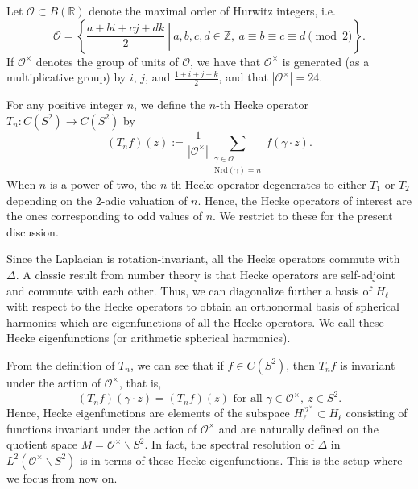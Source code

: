 \documentclass[11pt]{amsart}
\newcommand{\bigo}{\mathcal{O}}
\newcommand{\R}{\mathbb{R}}
\theoremstyle{definition}
\theoremstyle{remark}
\begin{document}
Let $\bigo\subset B(\R)$ denote the maximal order of Hurwitz integers, i.e. $$\bigo = \left\{ \left. \frac{a+bi+cj+dk}{2} \: \right| \: a,b,c,d\in \mathbb{Z}, \: a\equiv b\equiv c\equiv d \pmod{2} \right\}.$$ If $\bigo^{\times}$ denotes the group of units of $\bigo$, we have that $\bigo^{\times}$ is generated (as a multiplicative group) by $i$, $j$, and $\frac{1+i+j+k}{2}$, and that $|\bigo^{\times}| = 24$. 

For any positive integer $n$, we define the $n$-th Hecke operator $T_n : C(S^2) \rightarrow C(S^2)$ by $$ (T_n f)(z) := \frac{1}{|\bigo^{\times}|}\sum_{\substack{\gamma \in \bigo \\ \mathrm{Nrd}(\gamma) = n}} f(\gamma \cdot z).$$ When $n$ is a power of two, the $n$-th Hecke operator degenerates to either $T_1$ or $T_2$ depending on the $2$-adic valuation of $n$. Hence, the Hecke operators of interest are the ones corresponding to odd values of $n$. We restrict to these for the present discussion.

Since the Laplacian is rotation-invariant, all the Hecke operators commute with $\Delta$. A classic result from number theory is that Hecke operators are self-adjoint and commute with each other. Thus, we can diagonalize further a basis of $H_{\ell}$ with respect to the Hecke operators to obtain an orthonormal basis of spherical harmonics which are eigenfunctions of all the Hecke operators. We call these Hecke eigenfunctions (or arithmetic spherical harmonics).

From the definition of $T_n$, we can see that if $f\in C(S^2)$, then $T_n f$ is invariant under the action of $\bigo^{\times}$, that is, $$(T_n f)(\gamma \cdot z) = (T_n f)(z) \text{ for all } \gamma \in \bigo^{\times}, \: z\in S^2.$$ Hence, Hecke eigenfunctions are elements of the subspace $H_{\ell}^{\bigo^{\times}} \subset H_{\ell}$ consisting of functions invariant under the action of $\bigo^{\times}$ and are naturally defined on the quotient space $M=\bigo^{\times} \backslash S^2$. In fact, the spectral resolution of $\Delta$ in $L^2(\bigo^{\times} \backslash S^2)$ is in terms of these Hecke eigenfunctions. This is the setup where we focus from now on.
\end{document}
